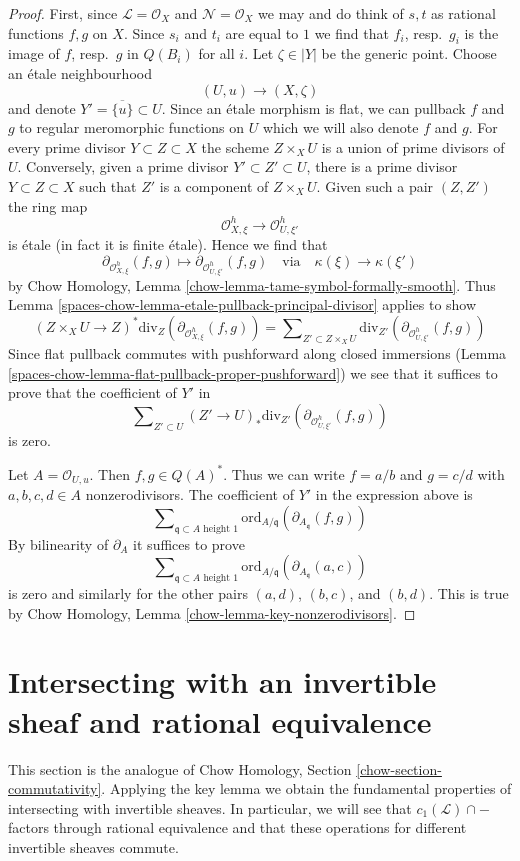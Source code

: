 \begin{proof}
\medskip\noindent
First, since $\mathcal{L} = \mathcal{O}_X$ and $\mathcal{N} = \mathcal{O}_X$
we may and do think of $s, t$ as rational functions $f, g$ on $X$.
Since $s_i$ and $t_i$ are equal to $1$ we find that $f_i$, resp.\ $g_i$
is the image of $f$, resp.\ $g$ in $Q(B_i)$ for all $i$.
Let $\zeta \in |Y|$ be the generic point. Choose an
\'etale neighbourhood
$$
(U, u) \longrightarrow (X, \zeta)
$$
and denote $Y' = \overline{\{u\}} \subset U$.
Since an \'etale morphism is flat, we can pullback $f$ and $g$
to regular meromorphic functions on $U$ which we will also denote
$f$ and $g$.
For every prime divisor $Y \subset Z \subset X$ the scheme $Z \times_X U$
is a union of prime divisors of $U$. Conversely, given a prime divisor
$Y' \subset Z' \subset U$, there is a prime divisor
$Y \subset Z \subset X$ such that $Z'$ is a component of $Z \times_X U$.
Given such a pair $(Z, Z')$ the ring map
$$
\mathcal{O}_{X, \xi}^h \to \mathcal{O}_{U, \xi'}^h
$$
is \'etale (in fact it is finite \'etale). Hence we find that
$$
\partial_{\mathcal{O}_{X, \xi}^h}(f, g) \mapsto
\partial_{\mathcal{O}_{U, \xi'}^h}(f, g)
\quad\text{via}\quad
\kappa(\xi) \to \kappa(\xi')
$$
by Chow Homology, Lemma \ref{chow-lemma-tame-symbol-formally-smooth}.
Thus Lemma \ref{spaces-chow-lemma-etale-pullback-principal-divisor} applies to show
$$
(Z \times_X U \to Z)^*\text{div}_Z(\partial_{\mathcal{O}_{X, \xi}^h}(f, g))
=
\sum\nolimits_{Z' \subset Z \times_X U}
\text{div}_{Z'}(\partial_{\mathcal{O}_{U, \xi'}^h}(f, g))
$$
Since flat pullback commutes with pushforward along closed
immersions (Lemma \ref{spaces-chow-lemma-flat-pullback-proper-pushforward})
we see that it suffices to prove that the coefficient
of $Y'$ in
$$
\sum\nolimits_{Z' \subset U}
(Z' \to U)_*\text{div}_{Z'}(\partial_{\mathcal{O}_{U, \xi'}^h}(f, g))
$$
is zero.

\medskip\noindent
Let $A = \mathcal{O}_{U, u}$. Then $f, g \in Q(A)^*$.
Thus we can write $f = a/b$ and $g = c/d$ with
$a, b, c, d \in A$ nonzerodivisors.
The coefficient of $Y'$ in the expression above is
$$
\sum\nolimits_{\mathfrak q \subset A\text{ height }1}
\text{ord}_{A/\mathfrak q}(\partial_{A_\mathfrak q}(f, g))
$$
By bilinearity of $\partial_A$ it suffices to prove
$$
\sum\nolimits_{\mathfrak q \subset A\text{ height }1}
\text{ord}_{A/\mathfrak q}(\partial_{A_\mathfrak q}(a, c))
$$
is zero and similarly for the other pairs $(a, d)$, $(b, c)$, and
$(b, d)$. This is true by
Chow Homology, Lemma \ref{chow-lemma-key-nonzerodivisors}.
\end{proof}

\section{Intersecting with an invertible sheaf and rational equivalence}
\label{spaces-chow-section-commutativity}
This section is the analogue of Chow Homology, Section
\ref{chow-section-commutativity}.
Applying the key lemma we obtain the fundamental properties of intersecting
with invertible sheaves. In particular, we will see that
$c_1(\mathcal{L}) \cap -$ factors through rational equivalence and
that these operations for different invertible sheaves commute.

